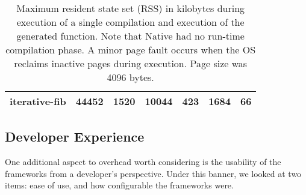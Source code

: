\begin{table*}[t]
\begin{tabular}{|r|l|l|l|l|l|l|}
  iterative-fib                           
  & \multicolumn{1}{r|}{\num{44452}} %
  & \multicolumn{1}{r|}{\num{1520}}
  & \multicolumn{1}{r|}{\num{10044}} %
  & \multicolumn{1}{r|}{\num{423}}
  & \multicolumn{1}{r|}{\num{1684}}   %
  & \multicolumn{1}{r|}{\num{66}}  
  \\ \hline
  
\end{tabular}
  \caption{Maximum resident state set (RSS) in kilobytes during execution of a single compilation and execution of the generated function. Note that Native had no run-time compilation phase. A minor page fault occurs when the OS reclaims inactive pages during execution. Page size was 4096 bytes.}
  \label{tab:max_rss}
\end{table*}

\subsection{Developer Experience}
One additional aspect to overhead worth considering is the usability of the frameworks from a developer's perspective.
Under this banner, we looked at two items: ease of use, and how configurable the frameworks were.

